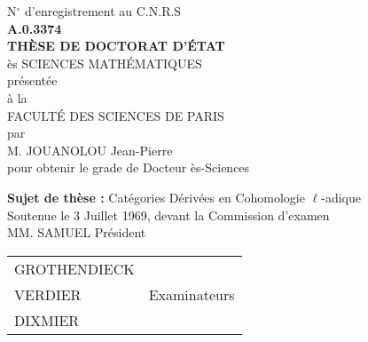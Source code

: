 \documentclass[12pt,twoside]{report} %
\theoremstyle{plain}
\theoremstyle{definition}
\begin{document}
\thispagestyle{empty}
\vspace*{\fill}
\begin{center}
    {\large N$^\circ$ d'enregistrement au C.N.R.S} \\
    \vspace{0.5em}
    {\bf A.0.3374} \\
    \vspace{4em}
    {\LARGE\bf THÈSE DE DOCTORAT D'ÉTAT} \\
    \vspace{0.5em}
    {\large ès SCIENCES MATHÉMATIQUES} \\
    \vspace{1em}
    présentée \\
    à la \\
    FACULTÉ DES SCIENCES DE PARIS \\
    \vspace{2em}
    par \\
    \vspace{2em}
    {\Large M. JOUANOLOU Jean-Pierre} \\
    \vspace{1em}
    pour obtenir le grade de Docteur ès-Sciences \\
\end{center}
\vspace*{\fill}
\begin{center}
    {\bf Sujet de thèse :} {\Large Catégories Dérivées en Cohomologie $\ell$-adique} \\
    \vspace{1em}
    Soutenue le 3 Juillet 1969, devant la Commission d'examen \\
    \vspace{1em}
    MM. SAMUEL \quad\quad Président \\
    \vspace{0.5em}
\begin{tabular}{@{}l@{\hspace{3cm}}r@{}}
GROTHENDIECK & \\
VERDIER & Examinateurs \\
DIXMIER & \\
\end{tabular}
\end{center}
\vspace*{\fill}

\end{document}
